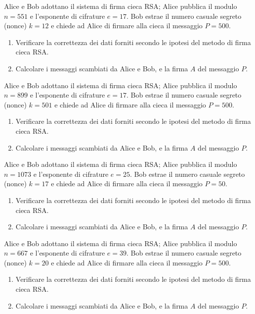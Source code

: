         Alice e Bob adottano il sistema di firma cieca RSA; Alice pubblica il modulo $n=551$ e l'esponente 
        di cifrature $e=17$. Bob estrae il numero casuale segreto (nonce) $k=12$ e chiede ad Alice di firmare 
        alla cieca il messaggio $P=500$.
        \begin{enumerate}
            \item Verificare la correttezza dei dati forniti secondo le ipotesi del metodo di firma cieca RSA.
            \item Calcolare i messaggi scambiati da Alice e Bob, e la firma $A$ del messaggio $P$.
        \end{enumerate}

        Alice e Bob adottano il sistema di firma cieca RSA; Alice pubblica il modulo $n=899$ e l'esponente 
        di cifrature $e=17$. Bob estrae il numero casuale segreto (nonce) $k=501$ e chiede ad Alice di firmare 
        alla cieca il messaggio $P=500$.
        \begin{enumerate}
            \item Verificare la correttezza dei dati forniti secondo le ipotesi del metodo di firma cieca RSA.
            \item Calcolare i messaggi scambiati da Alice e Bob, e la firma $A$ del messaggio $P$.
        \end{enumerate}

        Alice e Bob adottano il sistema di firma cieca RSA; Alice pubblica il modulo $n=1073$ e l'esponente 
        di cifrature $e=25$. Bob estrae il numero casuale segreto (nonce) $k=17$ e chiede ad Alice di firmare 
        alla cieca il messaggio $P=50$.
        \begin{enumerate}
            \item Verificare la correttezza dei dati forniti secondo le ipotesi del metodo di firma cieca RSA.
            \item Calcolare i messaggi scambiati da Alice e Bob, e la firma $A$ del messaggio $P$.
        \end{enumerate}

        Alice e Bob adottano il sistema di firma cieca RSA; Alice pubblica il modulo $n=667$ e l'esponente 
        di cifrature $e=39$. Bob estrae il numero casuale segreto (nonce) $k=20$ e chiede ad Alice di firmare 
        alla cieca il messaggio $P=500$.
        \begin{enumerate}
            \item Verificare la correttezza dei dati forniti secondo le ipotesi del metodo di firma cieca RSA.
            \item Calcolare i messaggi scambiati da Alice e Bob, e la firma $A$ del messaggio $P$.
        \end{enumerate}

